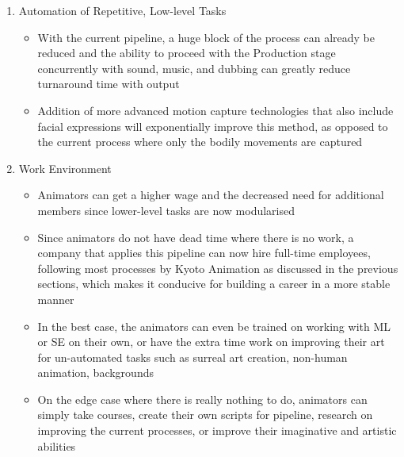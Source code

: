 \begin{enumerate}
    \item Automation of Repetitive, Low-level Tasks
    \begin{itemize}
        \item With the current pipeline, a huge block of the process can already be reduced and the ability to proceed with the Production stage concurrently with sound, music, and dubbing can greatly reduce turnaround time with output
        \item Addition of more advanced motion capture technologies that also include facial expressions will exponentially improve this method, as opposed to the current process where only the bodily movements are captured
    \end{itemize}

    \item Work Environment
    \begin{itemize}
        \item Animators can get a higher wage and the decreased need for additional members since lower-level tasks are now modularised
        \item Since animators do not have dead time where there is no work, a company that applies this pipeline can now hire full-time employees, following most processes by Kyoto Animation as discussed in the previous sections, which makes it conducive for building a career in a more stable manner
        \item In the best case, the animators can even be trained on working with ML or SE on their own, or have the extra time work on improving their art for un-automated tasks such as surreal art creation, non-human animation, backgrounds
        \item On the edge case where there is really nothing to do, animators can simply take courses, create their own scripts for pipeline, research on improving the current processes, or improve their imaginative and artistic abilities
    \end{itemize}


\end{enumerate}
